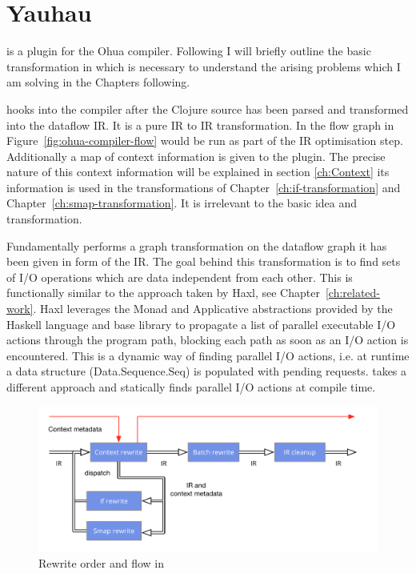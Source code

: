 \chapter{Yauhau}

\label{ch:Yauhau}

\yauhau{} is a plugin for the Ohua compiler.
Following I will briefly outline the basic transformation in \yauhau{} which is necessary to understand the arising problems which I am solving in the Chapters following.

\yauhau{} hooks into the compiler after the Clojure source has been parsed and transformed into the dataflow IR.
It is a pure IR to IR transformation.
In the flow graph in Figure~\ref{fig:ohua-compiler-flow} \yauhau{} would be run as part of the IR optimisation step.
Additionally a map of context information is given to the plugin.
The precise nature of this context information will be explained in section \ref{ch:Context} its information is used in the transformations of Chapter~\ref{ch:if-transformation} and Chapter~\ref{ch:smap-transformation}.
It is irrelevant to the basic \yauhau{} idea and transformation.

Fundamentally \yauhau{} performs a graph transformation on the dataflow graph it has been given in form of the IR.
The goal behind this transformation is to find sets of I/O operations which are data independent from each other.
This is functionally similar to the approach taken by Haxl\cite{Haxl:library:link}, see Chapter~\ref{ch:related-work}.
Haxl leverages the Monad and Applicative abstractions provided by the Haskell language and base library to propagate a list of parallel executable I/O actions through the program path, blocking each path as soon as an I/O action is encountered.
This is a dynamic way of finding parallel I/O actions, i.e. at runtime a data structure (Data.Sequence.Seq) is populated with pending requests.
\yauhau{} takes a different approach and statically finds parallel I/O actions at compile time.

\begin{figure}
    \includegraphics[width=\textwidth]{../Figures/yauhau-rewrite-flow}
    \caption{Rewrite order and flow in \yauhau{}}
    \label{fig:yauhau-rewrite-flow}
\end{figure}

